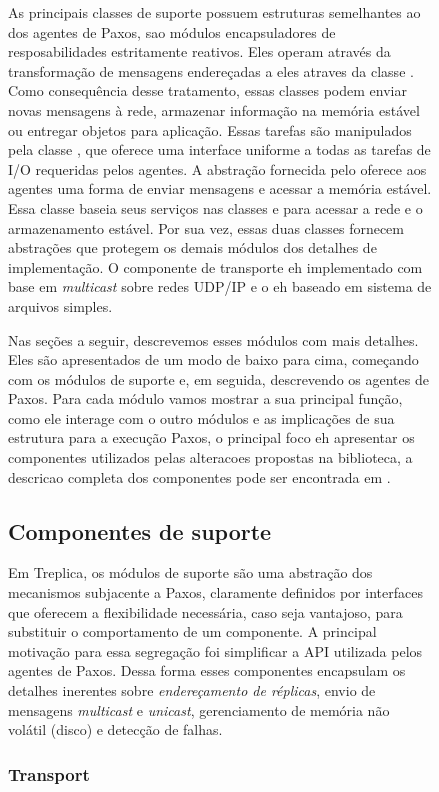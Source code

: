 \begin{figure}[ht]
As principais classes de suporte possuem estruturas semelhantes ao dos agentes de Paxos,
sao módulos encapsuladores de resposabilidades estritamente reativos. Eles operam através
da transformação de mensagens endereçadas a eles atraves da classe .
Como consequência desse tratamento, essas classes podem enviar novas mensagens à rede,
armazenar informação na memória estável ou entregar objetos para aplicação. Essas tarefas
são manipulados pela classe , que oferece uma interface uniforme a
todas as tarefas de I/O requeridas pelos agentes. A abstração fornecida pelo
 oferece aos agentes uma forma de enviar mensagens e acessar a
memória estável. Essa classe baseia seus serviços nas classes  e
 para acessar a rede e o armazenamento estável. Por sua vez, essas
duas classes fornecem abstrações que protegem os demais módulos dos detalhes de
implementação. O componente de transporte eh implementado com base em \emph{multicast}
sobre redes UDP/IP e o  eh baseado em sistema de arquivos simples.

Nas seções a seguir, descrevemos esses módulos com mais detalhes. Eles são apresentados
de um modo de baixo para cima, começando com os módulos de suporte e, em seguida,
descrevendo os agentes de Paxos. Para cada módulo vamos mostrar a sua principal função,
como ele interage com o outro módulos e as implicações de sua estrutura para a execução
Paxos, o principal foco eh apresentar os componentes utilizados pelas alteracoes propostas
na biblioteca, a descricao completa dos componentes pode ser encontrada em
\cite{vieira-tr10b}.

\subsection{Componentes de suporte}

Em Treplica, os módulos de suporte são uma abstração dos mecanismos subjacente a Paxos,
claramente definidos por interfaces que oferecem a flexibilidade necessária, caso seja
vantajoso, para substituir o comportamento de um componente. A principal motivação para
essa segregação foi simplificar a API utilizada pelos agentes de Paxos. Dessa forma esses
componentes encapsulam os detalhes inerentes sobre \emph{endereçamento de réplicas}, envio
de mensagens \emph{multicast} e \emph{unicast}, gerenciamento de memória não volátil
(disco) e detecção de falhas.

\subsubsection{Transport}\label{subsec:transport}


\end{figure}
